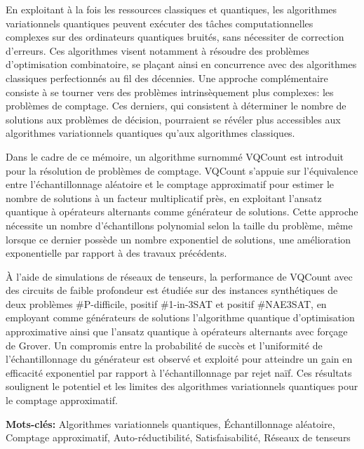 En exploitant à la fois les ressources classiques et quantiques, les algorithmes variationnels quantiques peuvent exécuter des tâches computationnelles complexes sur des ordinateurs quantiques bruités, sans nécessiter de correction d'erreurs. Ces algorithmes visent notamment à résoudre des problèmes d'optimisation combinatoire, se plaçant ainsi en concurrence avec des algorithmes classiques perfectionnés au fil des décennies. Une approche complémentaire consiste à se tourner vers des problèmes intrinsèquement plus complexes: les problèmes de comptage. Ces derniers, qui consistent à déterminer le nombre de solutions aux problèmes de décision, pourraient se révéler plus accessibles aux algorithmes variationnels quantiques qu'aux algorithmes classiques.

Dans le cadre de ce mémoire, un algorithme surnommé VQCount est introduit pour la résolution de problèmes de comptage. VQCount s'appuie sur l'équivalence entre l'échantillonnage aléatoire et le comptage approximatif pour estimer le nombre de solutions à un facteur multiplicatif près, en exploitant l'ansatz quantique à opérateurs alternants comme générateur de solutions. Cette approche nécessite un nombre d'échantillons polynomial selon la taille du problème, même lorsque ce dernier possède un nombre exponentiel de solutions, une amélioration exponentielle par rapport à des travaux précédents.

À l'aide de simulations de réseaux de tenseurs, la performance de VQCount avec des circuits de faible profondeur est étudiée sur des instances synthétiques de deux problèmes \textsf{\#P}-difficile, positif \#1-in-3SAT et positif \#NAE3SAT, en employant comme générateurs de solutions l'algorithme quantique d'optimisation approximative ainsi que l'ansatz quantique à opérateurs alternants avec forçage de Grover. Un compromis entre la probabilité de succès et l'uniformité de l'échantillonnage du générateur est observé et exploité pour atteindre un gain en efficacité exponentiel par rapport à l'échantillonnage par rejet naïf. Ces résultats soulignent le potentiel et les limites des algorithmes variationnels quantiques pour le comptage approximatif.

\noindent
\textbf{Mots-clés:} Algorithmes variationnels quantiques, Échantillonnage aléatoire, Comptage approximatif, Auto-réductibilité, Satisfaisabilité, Réseaux de tenseurs